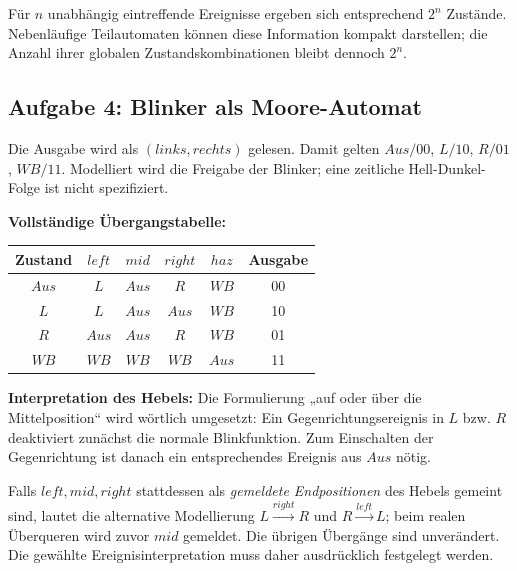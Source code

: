Für $n$ unabhängig eintreffende Ereignisse ergeben sich entsprechend $2^n$ Zustände. Nebenläufige Teilautomaten können diese Information kompakt darstellen; die Anzahl ihrer globalen Zustandskombinationen bleibt dennoch $2^n$.
\newpage
\subsection*{Aufgabe 4: Blinker als Moore-Automat}
Die Ausgabe wird als $(links,rechts)$ gelesen. Damit gelten $Aus/00$, $L/10$, $R/01$, $WB/11$. Modelliert wird die Freigabe der Blinker; eine zeitliche Hell-Dunkel-Folge ist nicht spezifiziert.
\begin{center}
\end{center}
\textbf{Vollständige Übergangstabelle:}
\begin{center}
\renewcommand{\arraystretch}{1.4}
\begin{tabular}{c|cccc|c}
Zustand & $left$ & $mid$ & $right$ & $haz$ & Ausgabe \\\hline
$Aus$ & $L$ & $Aus$ & $R$ & $WB$ & 00 \\
$L$ & $L$ & $Aus$ & $Aus$ & $WB$ & 10 \\
$R$ & $Aus$ & $Aus$ & $R$ & $WB$ & 01 \\
$WB$ & $WB$ & $WB$ & $WB$ & $Aus$ & 11
\end{tabular}
\end{center}
\textbf{Interpretation des Hebels:} Die Formulierung „auf oder über die Mittelposition“ wird wörtlich umgesetzt: Ein Gegenrichtungsereignis in $L$ bzw. $R$ deaktiviert zunächst die normale Blinkfunktion. Zum Einschalten der Gegenrichtung ist danach ein entsprechendes Ereignis aus $Aus$ nötig.

Falls $left,mid,right$ stattdessen als \emph{gemeldete Endpositionen} des Hebels gemeint sind, lautet die alternative Modellierung $L\xrightarrow{right}R$ und $R\xrightarrow{left}L$; beim realen Überqueren wird zuvor $mid$ gemeldet. Die übrigen Übergänge sind unverändert. Die gewählte Ereignisinterpretation muss daher ausdrücklich festgelegt werden.

